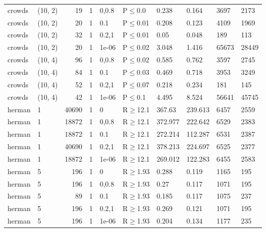\begin{longtable}{llrrllllll}
 crowds        & (10, 2)  &     	19 & 1 & 0,0.8 & P$\leq$0.0   & 0.238    & 0.164    & 3697    & 2173    \\
 crowds        & (10, 2)  &     	20 & 1 & 0.1   & P$\leq$0.01  & 0.208    & 0.123    & 4109    & 1969    \\
 crowds        & (10, 2)  &     	32 & 1 & 0.2,1 & P$\leq$0.01  & 0.05     & 0.048    & 189     & 113     \\
 crowds        & (10, 2)  &     	20 & 1 & 1e-06 & P$\leq$0.02  & 3.048    & 1.416    & 65673   & 28449   \\
 crowds        & (10, 4)  &     	96 & 1 & 0,0.8 & P$\leq$0.02  & 0.585    & 0.762    & 3597    & 2745    \\
 crowds        & (10, 4)  &     	84 & 1 & 0.1   & P$\leq$0.03  & 0.469    & 0.718    & 3953    & 3249    \\
 crowds        & (10, 4)  &     	52 & 1 & 0.2,1 & P$\leq$0.07  & 0.218    & 0.234    & 181     & 145     \\
 crowds        & (10, 4)  &     	42 & 1 & 1e-06 & P$\leq$0.1   & 4.495    & 8.524    & 56641   & 45745   \\
 herman        & 1        &  	40690 & 1 & 0     & R$\geq$12.1  & 367.63   & 239.613  & 6457    & 2559    \\
 herman        & 1        &  	18872 & 1 & 0,0.8 & R$\geq$12.1  & 372.977  & 222.642  & 6529    & 2383    \\
 herman        & 1        &  	18872 & 1 & 0.1   & R$\geq$12.1  & 272.214  & 112.287  & 6531    & 2387    \\
 herman        & 1        &  	40690 & 1 & 0.2,1 & R$\geq$12.1  & 378.213  & 224.697  & 6525    & 2377    \\
 herman        & 1        &  	18872 & 1 & 1e-06 & R$\geq$12.1  & 269.012  & 122.283  & 6455    & 2583    \\
 herman        & 5        &    	196 & 1 & 0     & R$\geq$1.93  & 0.288    & 0.119    & 1165    & 195     \\
 herman        & 5        &    	196 & 1 & 0,0.8 & R$\geq$1.93  & 0.27     & 0.117    & 1071    & 195     \\
 herman        & 5        &     	89 & 1 & 0.1   & R$\geq$1.93  & 0.185    & 0.117    & 1075    & 237     \\
 herman        & 5        &    	196 & 1 & 0.2,1 & R$\geq$1.93  & 0.269    & 0.121    & 1071    & 195     \\
 herman        & 5        &    	196 & 1 & 1e-06 & R$\geq$1.93  & 0.204    & 0.134    & 1177    & 235     \\

\end{longtable}
